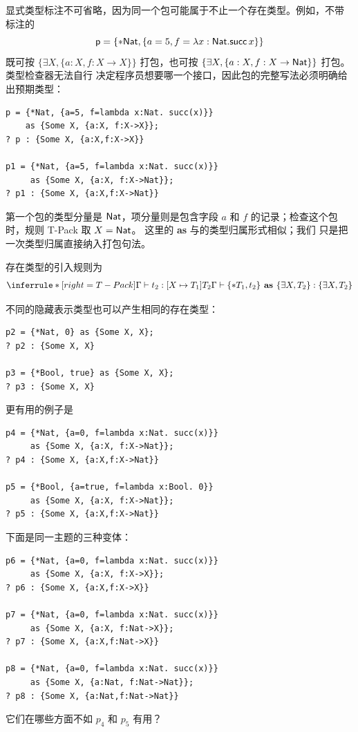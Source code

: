显式类型标注不可省略，因为同一个包可能属于不止一个存在类型。例如，不带
标注的
\[
\mathsf{p}=\{*\mathsf{Nat},
  \{a=5,f=\lambda x:\mathsf{Nat}.\mathsf{succ}\,x\}\}
\]
既可按 \(\{\exists X,\{a:X,f:X\to X\}\}\) 打包，也可按
\(\{\exists X,\{a:X,f:X\to\mathsf{Nat}\}\}\) 打包。类型检查器无法自行
决定程序员想要哪一个接口，因此包的完整写法必须明确给出预期类型：
\begin{lstlisting}
p = {*Nat, {a=5, f=lambda x:Nat. succ(x)}}
    as {Some X, {a:X, f:X->X}};
? p : {Some X, {a:X,f:X->X}}

p1 = {*Nat, {a=5, f=lambda x:Nat. succ(x)}}
     as {Some X, {a:X, f:X->Nat}};
? p1 : {Some X, {a:X,f:X->Nat}}
\end{lstlisting}
第一个包的类型分量是 \(\mathsf{Nat}\)，项分量则是包含字段 \(a\) 和
\(f\) 的记录；检查这个包时，规则 T-Pack 取 \(X=\mathsf{Nat}\)。
这里的 \textbf{as} 与的类型归属形式相似；我们
只是把一次类型归属直接纳入打包句法。

存在类型的引入规则为
\[
\inferrule*[right=T-Pack]
 {\Gamma\vdash t_2:[X\mapsto T_1]T_2}
 {\Gamma\vdash\{*T_1,t_2\}\textbf{ as }\{\exists X,T_2\}:
  \{\exists X,T_2\}}
\]

不同的隐藏表示类型也可以产生相同的存在类型：
\begin{lstlisting}
p2 = {*Nat, 0} as {Some X, X};
? p2 : {Some X, X}

p3 = {*Bool, true} as {Some X, X};
? p3 : {Some X, X}
\end{lstlisting}
更有用的例子是
\begin{lstlisting}
p4 = {*Nat, {a=0, f=lambda x:Nat. succ(x)}}
     as {Some X, {a:X, f:X->Nat}};
? p4 : {Some X, {a:X,f:X->Nat}}

p5 = {*Bool, {a=true, f=lambda x:Bool. 0}}
     as {Some X, {a:X, f:X->Nat}};
? p5 : {Some X, {a:X,f:X->Nat}}
\end{lstlisting}

\begin{exercise}[\(\star\)]
\label{ex:24.1.1}
下面是同一主题的三种变体：
\begin{lstlisting}
p6 = {*Nat, {a=0, f=lambda x:Nat. succ(x)}}
     as {Some X, {a:X, f:X->X}};
? p6 : {Some X, {a:X,f:X->X}}

p7 = {*Nat, {a=0, f=lambda x:Nat. succ(x)}}
     as {Some X, {a:X, f:Nat->X}};
? p7 : {Some X, {a:X,f:Nat->X}}

p8 = {*Nat, {a=0, f=lambda x:Nat. succ(x)}}
     as {Some X, {a:Nat, f:Nat->Nat}};
? p8 : {Some X, {a:Nat,f:Nat->Nat}}
\end{lstlisting}
它们在哪些方面不如 \(p_4\) 和 \(p_5\) 有用？
\end{exercise}

